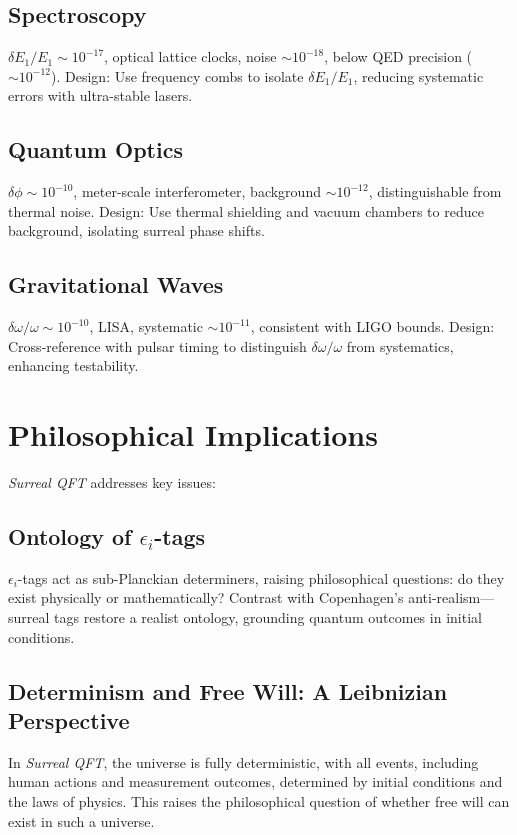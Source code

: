 \documentclass{article}
\begin{document}
\subsection{Spectroscopy}
\(\delta E_1 / E_1 \sim 10^{-17}\), optical lattice clocks, noise \(\sim 10^{-18}\), below QED precision (\(\sim 10^{-12}\)). Design: Use frequency combs to isolate \(\delta E_1 / E_1\), reducing systematic errors with ultra-stable lasers.

\subsection{Quantum Optics}
\(\delta \phi \sim 10^{-10}\), meter-scale interferometer, background \(\sim 10^{-12}\), distinguishable from thermal noise. Design: Use thermal shielding and vacuum chambers to reduce background, isolating surreal phase shifts.

\subsection{Gravitational Waves}
\(\delta \omega / \omega \sim 10^{-10}\), LISA, systematic \(\sim 10^{-11}\), consistent with LIGO bounds. Design: Cross-reference with pulsar timing to distinguish \(\delta \omega / \omega\) from systematics, enhancing testability.

\section{Philosophical Implications}
\textit{Surreal QFT} addresses key issues:
\subsection{Ontology of \(\epsilon_i\)-tags}
\(\epsilon_i\)-tags act as sub-Planckian determiners, raising philosophical questions: do they exist physically or mathematically? Contrast with Copenhagen's anti-realism---surreal tags restore a realist ontology, grounding quantum outcomes in initial conditions.

\subsection{Determinism and Free Will: A Leibnizian Perspective}
In \textit{Surreal QFT}, the universe is fully deterministic, with all events, including human actions and measurement outcomes, determined by initial conditions and the laws of physics. This raises the philosophical question of whether free will can exist in such a universe.
\end{document}

